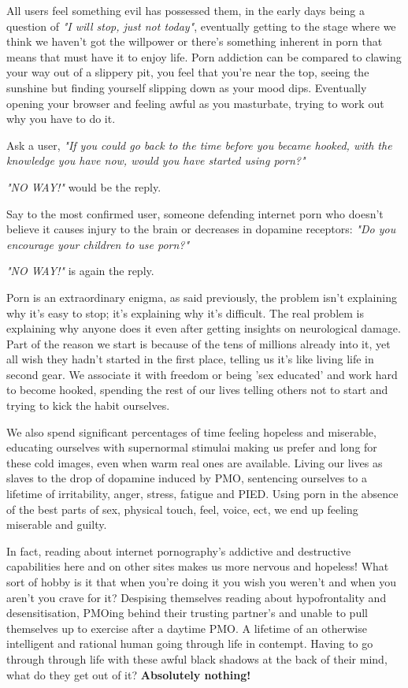 \documentclass[easypeasy.tex]{subfiles}
\begin{document}
All users feel something evil has possessed them, in the early days being a question of \textit{"I will stop, just not today"}, eventually getting to the stage where we think we haven't got the willpower or there's something inherent in porn that means that must have it to enjoy life. Porn addiction can be compared to clawing your way out of a slippery pit, you feel that you're near the top, seeing the sunshine but finding yourself slipping down as your mood dips. Eventually opening your browser and feeling awful as you masturbate, trying to work out why you have to do it.

Ask a user, \textit{"If you could go back to the time before you became hooked, with the knowledge you have now, would you have started using porn?"}

\textit{"NO WAY!"} would be the reply.

Say to the most confirmed user, someone defending internet porn who doesn't believe it causes injury to the brain or decreases in dopamine receptors: \textit{"Do you encourage your children to use porn?"}

\textit{"NO WAY!"} is again the reply.

Porn is an extraordinary enigma, as said previously, the problem isn't explaining why it's easy to stop; it's explaining why it's difficult. The real problem is explaining why anyone does it even after getting insights on neurological damage. Part of the reason we start is because of the tens of millions already into it, yet all wish they hadn't started in the first place, telling us it's like living life in second gear. We associate it with freedom or being 'sex educated' and work hard to become hooked, spending the rest of our lives telling others not to start and trying to kick the habit ourselves.

We also spend significant percentages of time feeling hopeless and miserable, educating ourselves with supernormal stimulai making us prefer and long for these cold images, even when warm real ones are available. Living our lives as slaves to the drop of dopamine induced by PMO, sentencing ourselves to a lifetime of irritability, anger, stress, fatigue and PIED. Using porn in the absence of the best parts of sex, physical touch, feel, voice, ect, we end up feeling miserable and guilty.

In fact, reading about internet pornography's addictive and destructive capabilities here and on other sites makes us more nervous and hopeless! What sort of hobby is it that when you're doing it you wish you weren't and when you aren't you crave for it? Despising themselves reading about hypofrontality and desensitisation, PMOing behind their trusting partner's and unable to pull themselves up to exercise after a daytime PMO. A lifetime of an otherwise intelligent and rational human going through life in contempt. Having to go through through life with these awful black shadows at the back of their mind, what do they get out of it? \textbf{Absolutely nothing!}
\end{document}
